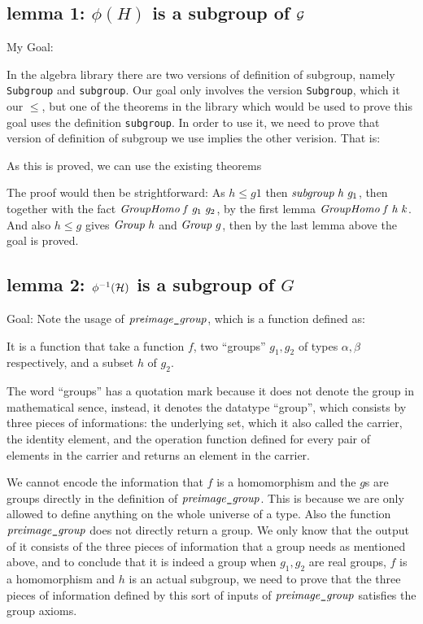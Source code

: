 \documentclass[letterpaper]{article}
\renewcommand{\HOLinline}[1]{\ensuremath{#1}}
\begin{document}
\subsection{lemma 1: $\phi (H)$ is a subgroup of ${\cal G}$}

My Goal:

In the algebra library there are two versions of definition of subgroup, namely \texttt{Subgroup} and \texttt{subgroup}. Our goal only involves the version \texttt{Subgroup}, which it our $\leq$, but one of the theorems in the library which would be used to prove this goal uses the definition \texttt{subgroup}. In order to use it, we need to prove that version of definition of subgroup we use implies the other verision. That is:

As this is proved, we can use the existing theorems

The proof would then be strightforward: As $h \leq g1$ then \HOLinline{\HOLFreeVar{subgroup}\;\HOLFreeVar{h}\;\HOLFreeVar{g\sb{\mathrm{1}}}}, then together with the fact \HOLinline{\HOLFreeVar{GroupHomo}\;\HOLFreeVar{f}\;\HOLFreeVar{g\sb{\mathrm{1}}}\;\HOLFreeVar{g\sb{\mathrm{2}}}}, by the first lemma \HOLinline{\HOLFreeVar{GroupHomo}\;\HOLFreeVar{f}\;\HOLFreeVar{h}\;\HOLFreeVar{k}}. And also $h\leq g$ gives \HOLinline{\HOLFreeVar{Group}\;\HOLFreeVar{h}} and \HOLinline{\HOLFreeVar{Group}\;\HOLFreeVar{g}}, then by the last lemma above the goal is proved.

\subsection{lemma 2: $\phi^{-1}({\cal H})$ is a subgroup of $G$}

Goal:
Note the usage of \HOLinline{\HOLFreeVar{preimage\HOLTokenUnderscore{}group}}, which is a function defined as:

It is a function that take a function $f$, two ``groups'' $g_1,g_2$ of types $\alpha,\beta$ respectively, and a subset $h$ of $g_2$.

The word ``groups'' has a quotation mark because it does not denote the group in mathematical sence, instead, it denotes the datatype ``group'', which consists by three pieces of informations: the underlying set, which it also called the carrier, the identity element, and the operation function defined for every pair of elements in the carrier and returns an element in the carrier.

We cannot encode the information that $f$ is a homomorphism and the $g$s are groups directly in the definition of \HOLinline{\HOLFreeVar{preimage\HOLTokenUnderscore{}group}}. This is because we are only allowed to define anything on the whole universe of a type. Also the function \HOLinline{\HOLFreeVar{preimage\HOLTokenUnderscore{}group}} does not directly return a group. We only know that the output of it consists of the three pieces of information that a group needs as mentioned above, and to conclude that it is indeed a group when $g_1,g_2$ are real groups, $f$ is a homomorphism and $h$ is an actual subgroup, we need to prove that the three pieces of information defined by this sort of inputs of \HOLinline{\HOLFreeVar{preimage\HOLTokenUnderscore{}group}} satisfies the group axioms.
\end{document}
